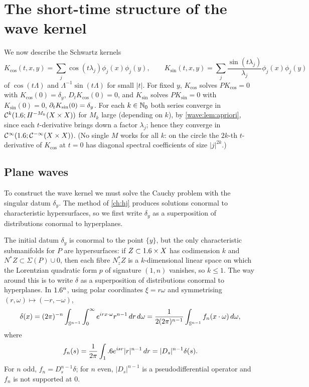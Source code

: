 \section{The short-time structure of the wave kernel}\label{wave:sec:parametrix}

We now describe the Schwartz kernels
\begin{equation*}
K_{\cos}(t,x,y)=\sum_j\cos(t\lambda_j)\phi_j(x)\phi_j(y),\qquad K_{\sin}(t,x,y)=\sum_j\frac{\sin(t\lambda_j)}{\lambda_j}\phi_j(x)\phi_j(y)
\end{equation*}
of $\cos(t\Lambda)$ and $\Lambda^{-1}\sin(t\Lambda)$ for small $|t|$. For fixed
$y$, $K_{\cos}$ solves $PK_{\cos}=0$ with $K_{\cos}(0)=\delta_y$,
$D_tK_{\cos}(0)=0$, and $K_{\sin}$ solves $PK_{\sin}=0$ with $K_{\sin}(0)=0$,
$\partial_tK_{\sin}(0)=\delta_y$. For each $k\in\mathbb{N}_0$ both series converge in
$\mathcal C^k(1.6;H^{-M_k}(X\times X))$ for $M_k$ large (depending on $k$), by
\cref{wave:lem:apriori}, since each $t$-derivative brings down a factor $\lambda_j$;
hence they converge in $\mathcal{C}^\infty(1.6;\mathcal{C}^{-\infty}(X\times X))$. (No single $M$ works for all $k$:
on the circle the $2k$-th $t$-derivative of $K_{\cos}$ at $t=0$ has diagonal spectral
coefficients of size $|j|^{2k}$.)

\subsection{Plane waves}

To construct the wave kernel we must solve the Cauchy problem with the singular
datum $\delta_y$. The method of \cref{ch:hj} produces solutions conormal to
characteristic hypersurfaces, so we first write $\delta_y$ as a superposition of
distributions conormal to hyperplanes.

The initial datum $\delta_y$ is conormal to the point $\{y\}$, but the only
characteristic submanifolds for $P$ are hypersurfaces: if $Z\subset1.6\times X$
has codimension $k$ and $N^*Z\subset\Sigma(P)\cup0$, then each fibre $N^*_zZ$ is a
$k$-dimensional linear space on which the Lorentzian quadratic form $p$ of
signature $(1,n)$ vanishes, so $k\le1$. The way around this is to write $\delta$
as a superposition of distributions conormal to hyperplanes. In $1.6^n$, using
polar coordinates $\xi=r\omega$ and symmetrising $(r,\omega)\mapsto(-r,-\omega)$,
\begin{equation}\label{wave:eq:plane-waves}
\delta(x)=(2\pi)^{-n}\int_{\mathbb{S}^{n-1}}\int_0^\infty e^{irx\cdot\omega}r^{n-1}\,dr\,d\omega
=\frac{1}{2(2\pi)^{n-1}}\int_{\mathbb{S}^{n-1}}f_n(x\cdot\omega)\,d\omega,
\end{equation}
where
\begin{equation*}
f_n(s)=\frac1{2\pi}\int_1.6 e^{isr}|r|^{n-1}\,dr=|D_s|^{n-1}\delta(s).
\end{equation*}
For $n$ odd, $f_n=D_s^{n-1}\delta$; for $n$ even, $|D_s|^{n-1}$ is a
pseudodifferential operator and $f_n$ is not supported at $0$.


